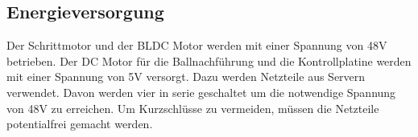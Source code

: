 \subsection{Energieversorgung}
Der Schrittmotor und der BLDC Motor werden mit einer Spannung von 48\si{\volt} 
betrieben. Der DC Motor für die Ballnachführung und die Kontrollplatine werden 
mit einer Spannung von 5\si{\volt} versorgt. Dazu werden Netzteile aus Servern 
verwendet. Davon werden vier in serie geschaltet um die notwendige Spannung 
von 48\si{\volt} zu erreichen. Um Kurzschlüsse zu vermeiden, müssen die 
Netzteile potentialfrei gemacht werden. 
